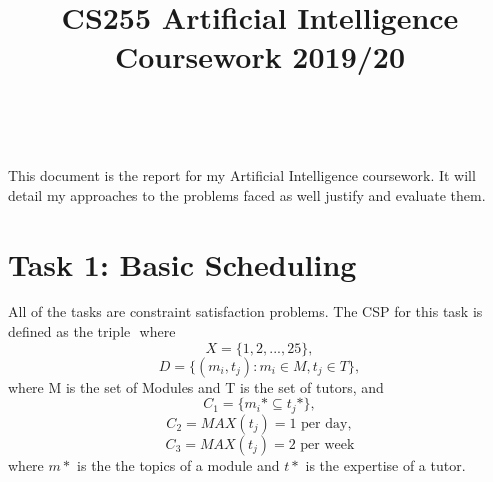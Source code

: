 \documentclass[conference]{IEEEtran}
\begin{document}
\title{CS255 Artificial Intelligence Coursework 2019/20} \\

\author{
}

\maketitle

This document is the report for my Artificial Intelligence coursework. It will detail my approaches to the problems faced as well justify and evaluate them.

\section{Task 1: Basic Scheduling}
All of the tasks are constraint satisfaction problems. The CSP for this task is defined as the triple \(<X, D, C>\) where 
\begin{equation*}
X = \{1, 2,..., 25\},
\end{equation*}
\begin{equation*}
D = \{(m_{i}, t_{j}): m_{i}\in M, t_{j}\in T\},
\end{equation*}
where M is the set of Modules and T is the set of tutors, and
\begin{equation*}
C_{1} = \{m_{i}*\subseteq t_{j}*\},
\end{equation*}
\begin{equation*}
C_{2} = MAX(t_{j}) = \textrm{1 per day},
\end{equation*}
\begin{equation*}
C_{3} = MAX(t_{j}) = \textrm{2 per week}
\end{equation*}
where \(m*\) is the the topics of a module and \(t*\) is the expertise of a tutor.
\end{document}
